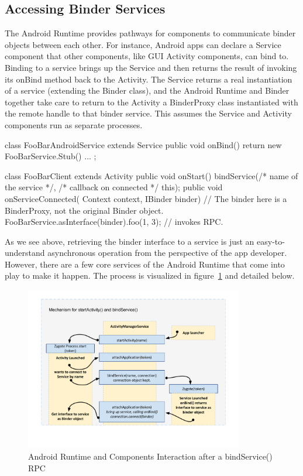 \documentclass[prodmode]{acmlarge}
\begin{document}
\subsection{Accessing Binder Services}
The Android Runtime provides pathways for components to communicate binder objects between each other. For instance, Android apps can declare a Service component that other components, like GUI Activity components, can bind to. Binding to a service brings up the Service and then returns the result of invoking its onBind method back to the Activity. The Service returns a real instantiation of a service (extending the Binder class), and the Android Runtime and Binder together take care to return to the Activity a BinderProxy class instantiated with the remote handle to that binder service. This assumes the Service and Activity components run as separate processes.

\begin{snippet}
class FooBarAndroidService extends Service {
  public void onBind() { return new FooBarService.Stub() { ... }; }
}

class FooBarClient extends Activity {
  public void onStart() { bindService(/* name of the service */,
                                      /* callback on connected */ this);
  }
  public void onServiceConnected(
    Context context, IBinder binder) {
    // The binder here is a BinderProxy, not the original Binder object.
    FooBarService.asInterface(binder).foo(1, 3);  // invokes RPC.
  }
}
\end{snippet}

As we see above, retrieving the binder interface to a service is just an easy-to-understand asynchronous operation from the perspective of the app developer. However, there are a few core services of the Android Runtime that come into play to make it happen. The process is visualized in figure~\ref{fig:BindService} and detailed below.

\begin{figure}[h]
\centering
\includegraphics[width=0.85\textwidth]{drawings/bindService.pdf}
\caption{Android Runtime and Components Interaction after a bindService() RPC}
\label{fig:BindService}
\end{figure}
\end{document}
